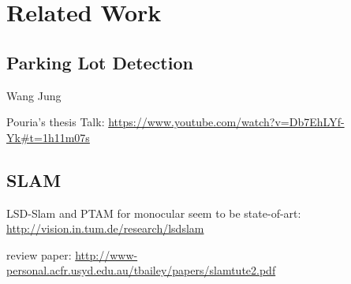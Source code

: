 \chapter{Related Work}




\section{Parking Lot Detection}
Wang \cite{wang2014automatic}
Jung \cite{jung2014semiautomatic}

Pouria's thesis \cite{talebifard2014risk}
Talk: \url{https://www.youtube.com/watch?v=Db7EhLYf-Yk#t=1h11m07s}

\section{SLAM}

LSD-Slam and PTAM for monocular seem to be state-of-art: \url{http://vision.in.tum.de/research/lsdslam}

review paper: \url{http://www-personal.acfr.usyd.edu.au/tbailey/papers/slamtute2.pdf}


